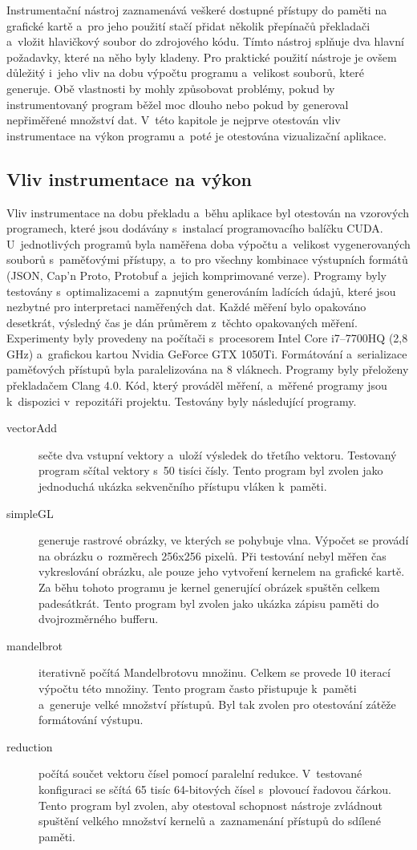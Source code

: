 Instrumentační nástroj zaznamenává veškeré dostupné přístupy do paměti na grafické kartě a~pro jeho použití stačí přidat několik přepínačů překladači a~vložit hlavičkový soubor do zdrojového kódu. Tímto nástroj splňuje dva hlavní požadavky, které na něho byly kladeny. Pro praktické použití nástroje je ovšem důležitý i~jeho vliv na dobu výpočtu programu a~velikost souborů, které generuje. Obě vlastnosti by mohly způsobovat problémy, pokud by instrumentovaný program běžel moc dlouho nebo pokud by generoval nepřiměřené množství dat. V~této kapitole je nejprve otestován vliv instrumentace na výkon programu a~poté je otestována vizualizační aplikace.

\subsection{Vliv instrumentace na výkon}
Vliv instrumentace na dobu překladu a~běhu aplikace byl otestován na vzorových programech, které jsou dodávány s~instalací programovacího balíčku CUDA. U~jednotlivých programů byla naměřena doba výpočtu a~velikost vygenerovaných souborů s~paměťovými přístupy, a~to pro všechny kombinace výstupních formátů (JSON, Cap'n Proto, Protobuf a~jejich komprimované verze). Programy byly testovány s~optimalizacemi a~zapnutým generováním ladících údajů, které jsou nezbytné pro interpretaci naměřených dat. Každé měření bylo opakováno desetkrát, výsledný čas je dán průměrem z~těchto opakovaných měření. Experimenty byly provedeny na počítači s~procesorem Intel Core i7–7700HQ (2,8 GHz) a~grafickou kartou Nvidia GeForce GTX 1050Ti. Formátování a~serializace paměťových přístupů byla paralelizována na 8 vláknech. Programy byly přeloženy překladačem Clang 4.0. Kód, který prováděl měření, a~měřené programy jsou k~dispozici v~repozitáři projektu. Testovány byly následující programy.
\begin{description}
	\item[vectorAdd] sečte dva vstupní vektory a~uloží výsledek do třetího vektoru. Testovaný program sčítal vektory s~50 tisíci čísly. Tento program byl zvolen jako jednoduchá ukázka sekvenčního přístupu vláken k~paměti.
	\item[simpleGL] generuje rastrové obrázky, ve kterých se pohybuje vlna. Výpočet se provádí na obrázku o~rozměrech 256x256 pixelů. Při testování nebyl měřen čas vykreslování obrázku, ale pouze jeho vytvoření kernelem na grafické kartě. Za běhu tohoto programu je kernel generující obrázek spuštěn celkem padesátkrát. Tento program byl zvolen jako ukázka zápisu paměti do dvojrozměrného bufferu.
	\item[mandelbrot] iterativně počítá Mandelbrotovu množinu. Celkem se provede 10 iterací výpočtu této množiny. Tento program často přistupuje k~paměti a~generuje velké množství přístupů. Byl tak zvolen pro otestování zátěže formátování výstupu.
	\item[reduction] počítá součet vektoru čísel pomocí paralelní redukce. V~testované konfiguraci se sčítá 65 tisíc 64-bitových čísel s~plovoucí řadovou čárkou. Tento program byl zvolen, aby otestoval schopnost nástroje zvládnout spuštění velkého množství kernelů a~zaznamenání přístupů do sdílené paměti.
\end{description}

